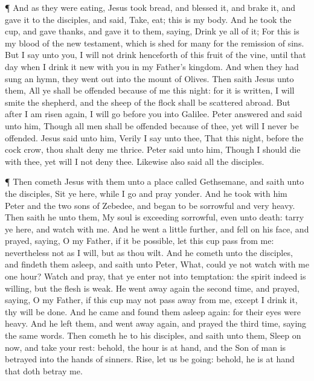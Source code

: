  ¶ And as they were eating, Jesus took bread, and blessed
it, and brake it, and gave it to the disciples, and said, Take, eat;
this is my body.  And he took the cup, and gave thanks, and
gave it to them, saying, Drink ye all of it;  For this is
my blood of the new testament, which is shed for many for the remission
of sins.  But I say unto you, I will not drink henceforth
of this fruit of the vine, until that day when I drink it new with you
in my Father's kingdom.  And when they had sung an hymn,
they went out into the mount of Olives.  Then saith Jesus
unto them, All ye shall be offended because of me this night: for it is
written, I will smite the shepherd, and the sheep of the flock shall be
scattered abroad.  But after I am risen again, I will go
before you into Galilee.  Peter answered and said unto him,
Though all men shall be offended because of thee, yet will I never be
offended.  Jesus said unto him, Verily I say unto thee,
That this night, before the cock crow, thou shalt deny me thrice.
 Peter said unto him, Though I should die with thee, yet
will I not deny thee. Likewise also said all the disciples.

 ¶ Then cometh Jesus with them unto a place called
Gethsemane, and saith unto the disciples, Sit ye here, while I go and
pray yonder.  And he took with him Peter and the two sons
of Zebedee, and began to be sorrowful and very heavy.  Then
saith he unto them, My soul is exceeding sorrowful, even unto death:
tarry ye here, and watch with me.  And he went a little
further, and fell on his face, and prayed, saying, O my Father, if it be
possible, let this cup pass from me: nevertheless not as I will, but as
thou wilt.  And he cometh unto the disciples, and findeth
them asleep, and saith unto Peter, What, could ye not watch with me one
hour?  Watch and pray, that ye enter not into temptation:
the spirit indeed is willing, but the flesh is weak.  He
went away again the second time, and prayed, saying, O my Father, if
this cup may not pass away from me, except I drink it, thy will be done.
 And he came and found them asleep again: for their eyes
were heavy.  And he left them, and went away again, and
prayed the third time, saying the same words.  Then cometh
he to his disciples, and saith unto them, Sleep on now, and take your
rest: behold, the hour is at hand, and the Son of man is betrayed into
the hands of sinners.  Rise, let us be going: behold, he is
at hand that doth betray me.


